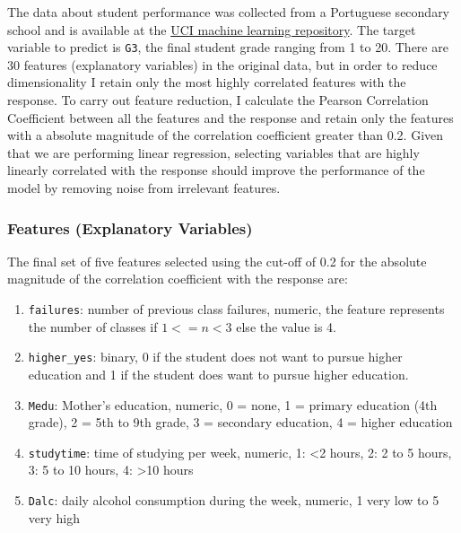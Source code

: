 \documentclass[12pt]{article}
\providecommand{\tightlist}{%
      \setlength{\itemsep}{0pt}\setlength{\parskip}{0pt}}
\begin{document}
The data about student performance was collected from a Portuguese
secondary school and is available at the
\href{http://archive.ics.uci.edu/ml/datasets/Student+Performance}{UCI
machine learning repository}. The target variable to predict is
\texttt{G3}, the final student grade ranging from 1 to 20. There are 30
features (explanatory variables) in the original data, but in order to
reduce dimensionality I retain only the most highly correlated features
with the response. To carry out feature reduction, I calculate the
Pearson Correlation Coefficient between all the features and the
response and retain only the features with a absolute magnitude of the
correlation coefficient greater than 0.2. Given that we are performing
linear regression, selecting variables that are highly linearly
correlated with the response should improve the performance of the model
by removing noise from irrelevant features.

\hypertarget{features-explanatory-variables}{%
\subsubsection{Features (Explanatory
Variables)}\label{features-explanatory-variables}}

The final set of five features selected using the cut-off of 0.2 for the
absolute magnitude of the correlation coefficient with the response are:

\begin{enumerate}
\def\labelenumi{\arabic{enumi}.}
\tightlist
\item
  \texttt{failures}: number of previous class failures, numeric, the
  feature represents the number of classes if \(1 <= n <3\) else the
  value is 4.
\item
  \texttt{higher\_yes}: binary, 0 if the student does not want to pursue
  higher education and 1 if the student does want to pursue higher
  education.
\item
  \texttt{Medu}: Mother's education, numeric, 0 = none, 1 = primary
  education (4th grade), 2 = 5th to 9th grade, 3 = secondary education,
  4 = higher education
\item
  \texttt{studytime}: time of studying per week, numeric, 1:
  \textless{}2 hours, 2: 2 to 5 hours, 3: 5 to 10 hours, 4:
  \textgreater{}10 hours
\item
  \texttt{Dalc}: daily alcohol consumption during the week, numeric, 1
  very low to 5 very high
\end{enumerate}
\end{document}
